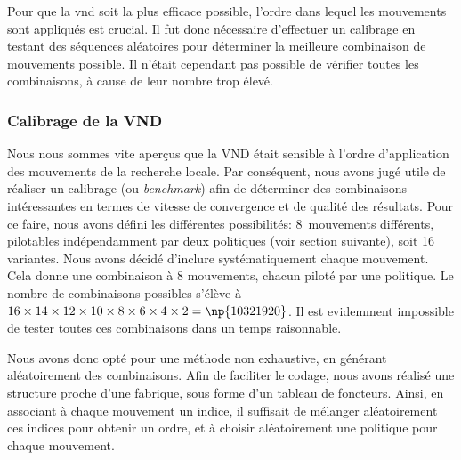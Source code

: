 			\begin{code}
				\begin{algo}[informal]
					\VAR
					\ENDVAR
					\BEGIN
						\REPEAT
							\ELSE
							\ENDIF
					\END
				\end{algo}
			\end{code}
			
			Pour que la \acrshort{vnd} soit la plus efficace possible, l'ordre dans lequel les mouvements sont appliqués est crucial. Il fut donc nécessaire d'effectuer un calibrage en testant des séquences aléatoires pour déterminer la meilleure combinaison de mouvements possible. Il n'était cependant pas possible de vérifier toutes les combinaisons, à cause de leur nombre trop élevé.
			
			\subsubsection{Calibrage de la VND}
				Nous nous sommes vite aperçus que la VND était sensible à l'ordre d'application des mouvements de la recherche locale. Par conséquent, nous avons jugé utile de réaliser un calibrage (ou \emph{benchmark}) afin de déterminer des combinaisons intéressantes en termes de vitesse de convergence et de qualité des résultats. Pour ce faire, nous avons défini les différentes possibilités: 8~mouvements différents, pilotables indépendamment par deux politiques (voir section suivante), soit 16 variantes. Nous avons décidé d'inclure systématiquement chaque mouvement. Cela donne une combinaison à 8 mouvements, chacun piloté par une politique. Le nombre de combinaisons possibles s'élève à $16 \times 14 \times 12 \times 10 \times 8 \times 6 \times 4 \times 2 = \np{10321920}$. Il est evidemment impossible de tester toutes ces combinaisons dans un temps raisonnable.

				Nous avons donc opté pour une méthode non exhaustive, en générant aléatoirement des combinaisons. Afin de faciliter le codage, nous avons réalisé une structure proche d'une fabrique, sous forme d'un tableau de foncteurs. Ainsi, en associant à chaque mouvement un indice, il suffisait de mélanger aléatoirement ces indices pour obtenir un ordre, et à choisir aléatoirement une politique pour chaque mouvement.

